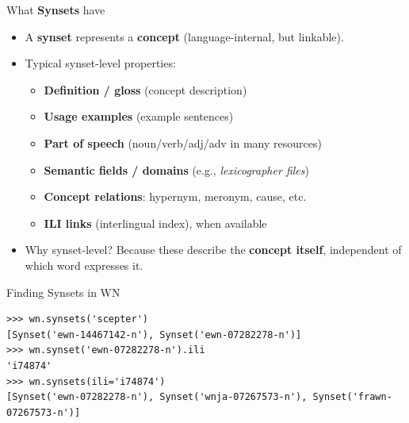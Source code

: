 \documentclass[aspectratio=169]{beamer}
\begin{document}
\begin{frame}{What \textbf{Synsets} have}
\begin{itemize}
  \item A \textbf{synset} represents a \textbf{concept} (language-internal, but linkable).
  \item Typical synset-level properties:
    \begin{itemize}
    \item \textbf{Definition / gloss} (concept description)
    \item \textbf{Usage examples} (example sentences)
      
    \item \textbf{Part of speech} (noun/verb/adj/adv in many resources)
    \item \textbf{Semantic fields / domains} (e.g., \emph{lexicographer files})
    \item \textbf{Concept relations}: hypernym, meronym, cause, etc.
    \item \textbf{ILI links} (interlingual index), when available
    \end{itemize}
  \item Why synset-level? Because these describe the \textbf{concept itself}, independent of which word expresses it.
\end{itemize}


\end{frame}


\begin{frame}[fragile]{Finding Synsets in WN}
\begin{verbatim}
>>> wn.synsets('scepter')
[Synset('ewn-14467142-n'), Synset('ewn-07282278-n')]
>>> wn.synset('ewn-07282278-n').ili
'i74874'
>>> wn.synsets(ili='i74874')
[Synset('ewn-07282278-n'), Synset('wnja-07267573-n'), Synset('frawn-07267573-n')]
\end{verbatim}
\end{frame}
\end{document}
